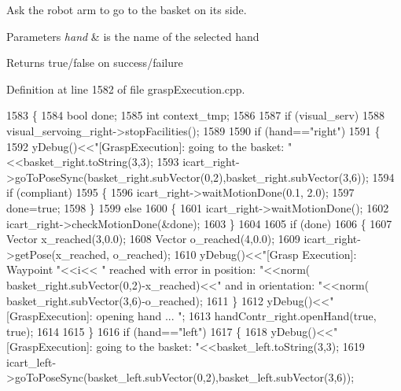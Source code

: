 Ask the robot arm to go to the basket on its side. 


\begin{DoxyParams}{Parameters}
{\em hand} & is the name of the selected hand \\
\hline
\end{DoxyParams}
\begin{DoxyReturn}{Returns}
true/false on success/failure 
\end{DoxyReturn}


Definition at line 1582 of file grasp\+Execution.\+cpp.


\begin{DoxyCode}
1583 \{
1584     \textcolor{keywordtype}{bool} done;
1585     \textcolor{keywordtype}{int} context\_tmp;
1586 
1587     \textcolor{keywordflow}{if} (visual_serv)
1588         visual_servoing_right->stopFacilities();
1589 
1590     \textcolor{keywordflow}{if} (hand==\textcolor{stringliteral}{"right"})
1591     \{
1592         yDebug()<<\textcolor{stringliteral}{"[GraspExecution]: going to the basket: "}<<basket_right.toString(3,3);
1593         icart\_right->goToPoseSync(basket_right.subVector(0,2),basket_right.subVector(3,6));
1594         \textcolor{keywordflow}{if} (compliant)
1595         \{
1596             icart\_right->waitMotionDone(0.1, 2.0);
1597             done=\textcolor{keyword}{true};
1598         \}
1599         \textcolor{keywordflow}{else}
1600         \{
1601             icart\_right->waitMotionDone();
1602             icart\_right->checkMotionDone(&done);
1603         \}
1604 
1605         \textcolor{keywordflow}{if} (done)
1606         \{
1607              Vector x\_reached(3,0.0);
1608              Vector o\_reached(4,0.0);
1609              icart\_right->getPose(x\_reached, o\_reached);
1610              yDebug()<<\textcolor{stringliteral}{"[Grasp Execution]: Waypoint "}<<i<< \textcolor{stringliteral}{" reached with error in position: "}<<norm(
      basket_right.subVector(0,2)-x\_reached)<<\textcolor{stringliteral}{" and in orientation: "}<<norm(
      basket_right.subVector(3,6)-o\_reached);
1611         \}
1612         yDebug()<<\textcolor{stringliteral}{"[GraspExecution]: opening hand ... "};
1613         handContr_right.openHand(\textcolor{keyword}{true}, \textcolor{keyword}{true});
1614 
1615     \}
1616     \textcolor{keywordflow}{if} (hand==\textcolor{stringliteral}{"left"})
1617     \{
1618         yDebug()<<\textcolor{stringliteral}{"[GraspExecution]: going to the basket: "}<<basket_left.toString(3,3);
1619         icart\_left->goToPoseSync(basket_left.subVector(0,2),basket_left.subVector(3,6));

\end{DoxyCode}
